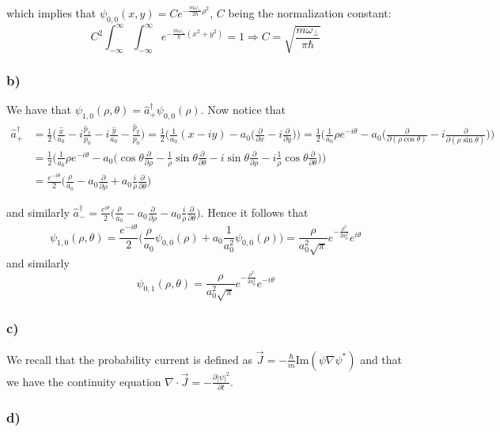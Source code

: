 \documentclass[10pt,a4paper]{book}
\newcommand{\p}{\partial}
\begin{document}
which implies that $\psi_{0,0}(x,y)=Ce^{-\frac{m\omega_{\perp}}{2\hbar}\rho^2}$, $C$ being the normalization constant:
$$C^2\int_{-\infty}^{\infty}\int_{-\infty}^{\infty} e^{-\frac{m\omega_{\perp}}{\hbar}(x^2+y^2)}=1\Rightarrow C=\sqrt{\frac{m\omega_{\perp}}{\pi \hbar}}$$

\subsubsection*{b)}

We have that $\psi_{1,0}(\rho,\theta)=\hat{a}_+^{\dagger}\psi_{0,0}(\rho)$. Now notice that
\begin{align*}
\hat{a}_{+}^{\dagger}&=\frac{1}{2}\bigg(\frac{\hat{x}}{a_0}-i\frac{\hat{p}_x}{p_0}-i\frac{\hat{y}}{a_0}-\frac{\hat{p}_y}{p_0}\bigg)=\frac{1}{2}\bigg(\frac{1}{a_0}(x-iy)-a_0\bigg(\frac{\p}{\p x}-i\frac{\p}{\p y}\bigg)\bigg)=\frac{1}{2}\bigg(\frac{1}{a_0}\rho e^{-i\theta}-a_0\bigg(\frac{\p}{\p (\rho\cos\theta)}-i\frac{\p}{\p (\rho\sin\theta)}\bigg)\bigg)\\
&=\frac{1}{2}\bigg(\frac{1}{a_0}\rho e^{-i\theta}-a_0\bigg(\cos\theta\frac{\p}{\p\rho}-\frac{1}{\rho}\sin\theta\frac{\p}{\p\theta}-i\sin\theta\frac{\p}{\p \rho}-i\frac{1}{\rho}\cos\theta\frac{\p}{\p\theta}\bigg)\bigg)\\
&=\frac{e^{-i\theta}}{2}\bigg(\frac{\rho}{a_0}-a_0\frac{\p}{\p\rho}+a_0\frac{i}{\rho}\frac{\p}{\p\theta}\bigg)
\end{align*}

and similarly $\hat{a}_-^{\dagger}=\frac{e^{i\theta}}{2}\big(\frac{\rho}{a_0}-a_0\frac{\p}{\p\rho}-a_0\frac{i}{\rho}\frac{\p}{\p\theta}\big)$.
Hence it follows that 
$$\psi_{1,0}(\rho,\theta)=\frac{e^{-i\theta}}{2}\bigg(\frac{\rho}{a_0}\psi_{0,0}(\rho)+a_0\frac{1}{a_0^2}\psi_{0,0}(\rho)\bigg)=\frac{\rho}{a_0^2\sqrt{\pi}}e^{-\frac{\rho^2}{2a_0^2}}e^{i\theta}$$
and similarly 
$$\psi_{0,1}(\rho,\theta)=\frac{\rho}{a_0^2\sqrt{\pi}}e^{-\frac{\rho^2}{2a_0^2}}e^{-i\theta}$$

\subsubsection*{c)}
We recall that the probability current is defined as $\vec{J}=-\frac{\hbar}{m}\text{Im}(\psi\nabla\psi^{*})$ and that we have the continuity equation $\nabla \cdot \vec{J}=-\frac{\p|\psi|^2}{\p t}$.

\subsubsection*{d)}
\end{document}

